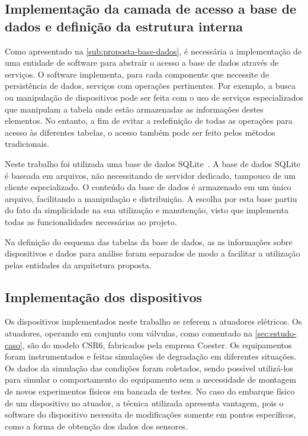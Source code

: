 \subsection{Implementação da camada de acesso a base de dados e definição da estrutura interna}

Como apresentado na \cref{sub:proposta-base-dados}, é necessária a implementação de uma entidade de
software para abstrair o acesso a base de dados através de serviços. O software implementa, para
cada componente que necessite de persistência de dados, serviços com operações pertinentes. Por
exemplo, a busca ou manipulação de dispositivos pode ser feita com o uso de serviços especializados
que manipulam a tabela onde estão armazenadas as informações destes elementos. No entanto, a fim de
evitar a redefinição de todas as operações para acesso às diferentes tabelas, o acesso também pode
ser feito pelos métodos tradicionais.

Neste trabalho foi utilizada uma base de dados SQLite~\cite{sqlite2013homepage}. A base de dados
SQLite é baseada em arquivos, não necessitando de servidor dedicado, tampouco de um cliente
especializado. O conteúdo da base de dados é armazenado em um único arquivo, facilitando a
manipulação e distribuição. A escolha por esta base partiu do fato da simplicidade na sua utilização
e manutenção, visto que implementa todas as funcionalidades necessárias ao projeto.

Na definição do esquema das tabelas da base de dados, as as informações sobre dispositivos e dados
para análise foram separados de modo a facilitar a utilização pelas entidades da arquitetura
proposta.



\subsection{Implementação dos dispositivos}

Os dispositivos implementados neste trabalho se referem a atuadores elétricos. Os atuadores,
operando em conjunto com válvulas, como comentado na \cref{sec:estudo-caso}, são do modelo CSR6,
fabricados pela empresa Coester. Os equipamentos foram instrumentados e feitas simulações de
degradação em diferentes situações. Os dados da simulação das condições foram coletados, sendo
possível utilizá-los para simular o comportamento do equipamento sem a necessidade de montagem de
novos experimentos físicos em bancada de testes. No caso do embarque físico de um dispositivo no
atuador, a técnica utilizada apresenta vantagem, pois o software do dispositivo necessita de
modificações somente em pontos específicos, como a forma de obtenção dos dados dos sensores.

